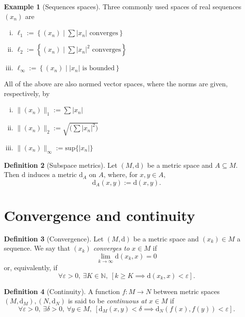 \documentclass[10pt,fleqn]{article}
\newcommand{\met}{\mathrm{d}}
\newcommand{\eps}{\varepsilon}
\theoremstyle{definition} \newtheorem{defn}{Definition}[section]
\theoremstyle{plain}      \newtheorem{thm}[defn]{Theorem}
\theoremstyle{definition} \newtheorem{prop}[defn]{Proposition}
\theoremstyle{definition} \newtheorem{cor}[defn]{Corollary}
\theoremstyle{definition} \newtheorem{ex}[defn]{Example}
\theoremstyle{definition} \newtheorem{rem}[defn]{Remark}
\begin{document}
\begin{ex}[Sequences spaces]
    Three commonly used spaces of real sequences $(x_n)$ are
    \begin{enumerate}[(i)]
        \item $\ell_1 := \left\{(x_n) \mid \sum|x_n|\text{ converges}\right\}$
        \item $\ell_2 := \left\{(x_n) \mid \sum|x_n|^2\text{ converges}\right\}$
        \item $\ell_{\infty} := \left\{(x_n) \mid |x_n|\text{ is bounded}\right\}$
    \end{enumerate}
    All of the above are also normed vector spaces, where the norms are given, respectively, by
    \begin{enumerate}[(i)]
        \item $\|(x_n)\|_1 := \sum|x_n|$
        \item $\|(x_n)\|_2 := \sqrt{\big(\sum|x_n|^2\big)}$
        \item $\|(x_n)\|_{\infty} := \mathrm{sup}\{|x_n|\}$
    \end{enumerate}
\end{ex}

\begin{defn}[Subspace metrics]
    Let $(M,\met)$ be a metric space and $A\subseteq M$.
    Then $\met$ induces a metric $\met_A$ on $A$, where, for $x,y\in A$,
    \[
        \met_A(x,y)
        := \met(x,y).
    \]
\end{defn}


\section{Convergence and continuity}

\begin{defn}[Convergence]
    Let $(M,\met)$ be a metric space and $(x_k)\in M$ a sequence.
    We say that $(x_k)$ \emph{converges to} $x\in M$ if
    \[
        \lim_{k\to\infty}\met(x_k,x) = 0
    \]
    or, equivalently, if
    \[
        \forall\eps>0,~
        \exists K\in\mathbb{N},~
        \left[k\geq K \implies \met(x_k,x)<\eps\right].
    \]
\end{defn}

\begin{defn}[Continuity]
    A function $f:M\to N$ between metric spaces $(M,\met_M),(N,\met_N)$ is said to be \emph{continuous at} $x\in M$ if
    \[
        \forall\eps>0,~
        \exists\delta>0,~
        \forall y\in M,~
        \left[\met_M(x,y)<\delta \implies \met_N(f(x),f(y))<\eps\right].
    \]
\end{defn}
\end{document}

